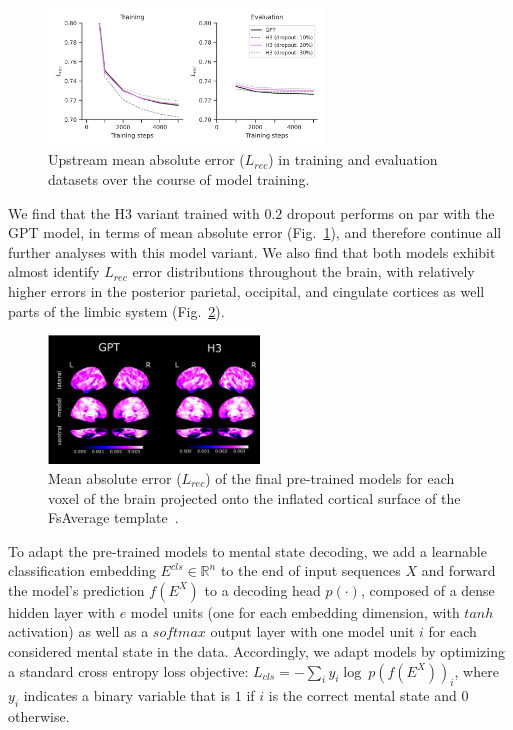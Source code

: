 \begin{figure}[h]
    \centering
    \includegraphics[width=0.65\textwidth]{figs/fmri_upstream-error.png}
    \caption{\label{fig:fmri-upstream} Upstream mean absolute error ($L_{rec}$) in training and evaluation datasets over the course of model training.}
\end{figure}

We find that the H3 variant trained with $0.2$ dropout performs on par with the GPT model, in terms of mean absolute error (Fig.\ \ref{fig:fmri-upstream}), and therefore continue all further analyses with this model variant. We also find that both models exhibit almost identify $L_{rec}$ error distributions throughout the brain, with relatively higher errors in the posterior parietal, occipital, and cingulate cortices as well parts of the limbic system (Fig.\ \ref{fig:fmri-upstream-brain}).

\begin{figure}[h]
    \centering
    \includegraphics[width=0.5\textwidth]{figs/fmri_upstream-error-brain.png}
    \caption{\label{fig:fmri-upstream-brain} Mean absolute error ($L_{rec}$) of the final pre-trained models for each voxel of the brain projected onto the inflated cortical surface of the FsAverage template~\citep{fischl_2012_freesurfer}.}
\end{figure}

To adapt the pre-trained models to mental state decoding, we add a learnable classification embedding $E^{cls} \in \mathbb{R}^{n}$ to the end of input sequences $X$ and forward the model's prediction $f(E^{X})$ to a decoding head $p(\cdot)$, composed of a dense hidden layer with $e$ model units (one for each embedding dimension, with $tanh$ activation) as well as a $softmax$ output layer with one model unit $i$ for each considered mental state in the data. Accordingly, we adapt models by optimizing a standard cross entropy loss objective: $L_{cls} = - \sum_i y_i \log \ {p(f(E^X))_i}$, where $y_i$ indicates a binary variable that is $1$ if $i$ is the correct mental state and $0$ otherwise.

